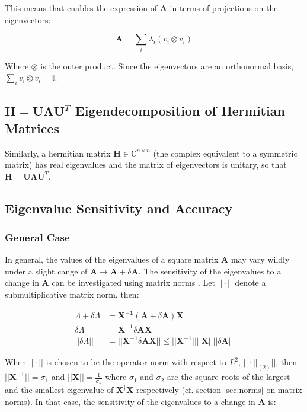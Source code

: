 This means that  enables the expression of $\mathbf{A}$ in terms of projections on the eigenvectors:

\begin{equation}
\mathbf{A} = \sum_i \lambda_i (v_i \otimes v_i)
\end{equation}

Where $\otimes$ is the outer product. Since the eigenvectors are an orthonormal basis, $\sum_i v_i \otimes v_i = \mathbb{I}$.


\subsection{$\mathbf{H} = \mathbf{U\Lambda U}^T$ Eigendecomposition of Hermitian Matrices}

Similarly, a hermitian matrix $\mathbf{H} \in \mathbb{C}^{n\times n}$ (the complex equivalent to a symmetric matrix) has real eigenvalues and the matrix of eigenvectors is unitary, so that $\mathbf{H} = \mathbf{U\Lambda U}^T$.


\subsection{Eigenvalue Sensitivity and Accuracy}

\subsubsection{General Case}

In general, the values of the eigenvalues of a square matrix $\mathbf{A}$ may vary wildly under a slight cange of $\mathbf{A} \rightarrow \mathbf{A}+\delta\mathbf{A}$. The sensitivity of the eigenvalues to a change in $\mathbf{A}$ can be investigated using matrix norms \cite{mathworkseig}. Let $||\cdot||$ denote a submultiplicative matrix norm, then:

\begin{equation}
\begin{array}{rl}
\Lambda + \delta\Lambda &= \mathbf{X^{-1}}\left( \mathbf{A} + \delta\mathbf{A} \right)\mathbf{X} \\
\delta\Lambda &= \mathbf{X^{-1}} \delta \mathbf{A} \mathbf{X}\\
||\delta\Lambda || &= ||\mathbf{X^{-1}} \delta \mathbf{A} \mathbf{X} || \leq  ||\mathbf{X^{-1}}|| ||\mathbf{X}|| ||\delta\mathbf{A}||
\end{array}
\end{equation}

When $||\cdot||$ is chosen to be the operator norm with respect to $L^2$, $||\cdot||_{(2)}||$, then $||\mathbf{X^{-1}}|| = \sigma_1$ and $||\mathbf{X}|| = \frac{1}{\sigma_n}$ where $\sigma_1$ and $\sigma_2$ are the square roots of the largest and the smallest eigenvalue of $\mathbf{X^{\dagger}}\mathbf{X}$ respectively (cf. section \ref{sec:norms} on matrix norms). In that case, the sensitivity of the eigenvalues to a change in $\mathbf{A}$ is:

